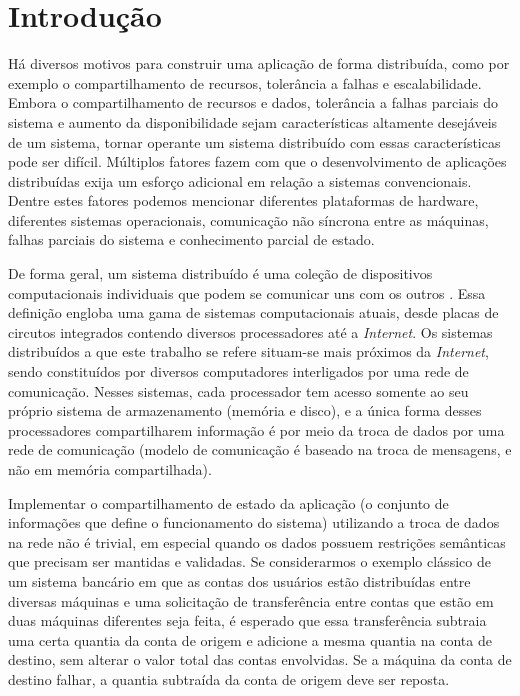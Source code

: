 \documentclass[11pt,twoside,a4paper]{book}
\begin{document}
\listoffigures
\listoftables
\listofalgorithms

\mainmatter

\fancyhead[RE,LO]{\thesection}

\singlespacing              %

\chapter{Introdução}
\label{chap:introducao}
Há diversos motivos para construir uma aplicação de forma distribuída, como por exemplo o compartilhamento de recursos, tolerância a falhas e escalabilidade. Embora o compartilhamento de recursos e dados, tolerância a falhas parciais do sistema e aumento da disponibilidade sejam características altamente desejáveis de um sistema, tornar operante um sistema distribuído com essas características pode ser difícil. Múltiplos fatores fazem com que o desenvolvimento de aplicações distribuídas exija um esforço adicional em relação a sistemas convencionais. Dentre estes fatores podemos mencionar diferentes plataformas de hardware, diferentes sistemas operacionais, comunicação não síncrona entre as máquinas, falhas parciais do sistema e conhecimento parcial de estado.

De forma geral, um sistema distribuído é uma coleção de dispositivos computacionais individuais que podem se comunicar uns com os outros \cite{tanenbaum, distributed_computing}. Essa definição engloba uma gama de sistemas computacionais atuais, desde placas de circutos integrados contendo diversos processadores até a \emph{Internet}. Os sistemas distribuídos a que este trabalho se refere situam-se mais próximos da \emph{Internet}, sendo constituídos por diversos computadores interligados por uma rede de comunicação. Nesses sistemas, cada processador tem acesso somente ao seu próprio sistema de armazenamento (memória e disco), e a única forma desses processadores compartilharem informação é por meio da troca de dados por uma rede de comunicação (modelo de comunicação é baseado na troca de mensagens, e não em memória compartilhada).

Implementar o compartilhamento de estado da aplicação (o conjunto de informações que define o funcionamento do sistema) utilizando a troca de dados na rede não é trivial, em especial quando os dados possuem restrições semânticas que precisam ser mantidas e validadas. Se considerarmos o exemplo clássico de um sistema bancário em que as contas dos usuários estão distribuídas entre diversas máquinas e uma solicitação de transferência entre contas que estão em duas máquinas diferentes seja feita, é esperado que essa transferência subtraia uma certa quantia da conta de origem e adicione a mesma quantia na conta de destino, sem alterar o valor total das contas envolvidas. Se a máquina da conta de destino falhar, a quantia subtraída da conta de origem deve ser reposta.
\end{document}
